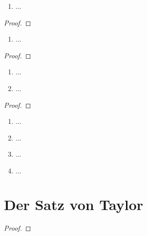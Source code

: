 \documentclass[12pt]{scrreprt}
\begin{document}
\begin{satz}\label{}

\end{satz}
\begin{bsp}\label{}
\begin{enumerate}
\item ...
\end{enumerate}
\end{bsp}
\begin{proof}

\end{proof}

\begin{bsp}\label{}
\begin{enumerate}
\item ...
\end{enumerate}
\end{bsp}
\begin{proof}

\end{proof}

\begin{thm}\label{}
\begin{enumerate}
\item ...
\item ...
\end{enumerate}
\end{thm}
\begin{proof}

\end{proof}

\begin{bsp}\label{}
\begin{enumerate}
\item ...
\item ...
\item ...
\item ...
\end{enumerate}
\end{bsp}

\section{Der Satz von Taylor}
\label{}

\begin{thm}\label{}

\end{thm}
\begin{proof}

\end{proof}
\end{document}
